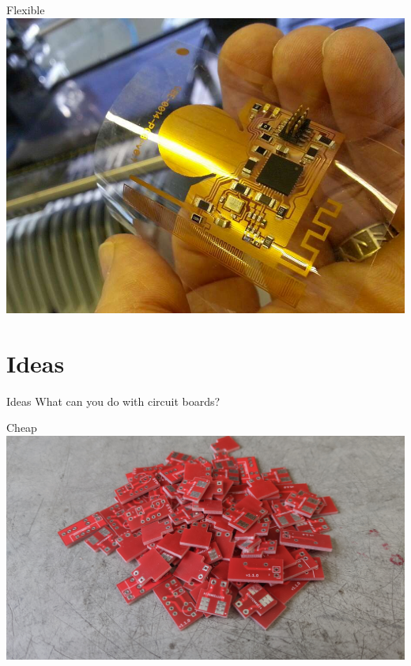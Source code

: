 \documentclass{presentation}
\begin{document}
\begin{frame}{Flexible}
  \includegraphics[width=\textwidth]{"./flex.jpg"}
\end{frame}

\section{Ideas}

\begin{frame}{Ideas}
  What can you do with circuit boards?
\end{frame}

\begin{frame}{Cheap}
  \centering
  \includegraphics[width=\textwidth]{"./cheap.jpg"}
\end{frame}
\end{document}
